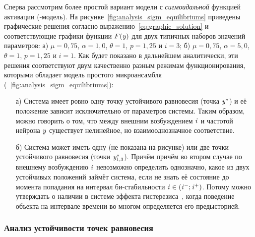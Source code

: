 Сперва рассмотрим более простой вариант модели с \textit{сигмоидальной} функцией активации (-модель). На рисунке~\ref{fig:analysis_sigm_equilibriums} приведены графические решения согласно выражению~\eqref{eq:graphic_solution} и соответствующие графики функции $F(\mathit{y})$ для двух типичных наборов значений параметров: а) $\mu = 0,75$, $\alpha = 1,0$, $\theta = 1$, $p = 1,25$ и $i = 3$; б) $\mu = 0,75$, $\alpha = 5,0$, $\theta = 1$, $p = 1,25$ и $i = 1$.
Как будет показано в дальнейшем аналитически, эти решения соответствуют двум качественно разным режимам функционирования, которыми обладает модель простого микроансамбля (\seefigure~\ref{fig:analysis_sigm_equilibriums}):
\begin{itemize}
    \item[а)] Система имеет ровно одну точку устойчивого равновесия (точка $\mathit{y}^{*}$) и её положение зависит исключительно от параметров системы. Таким образом, можно говорить о том, что между внешним возбуждением $\mathit{i}$ и частотой нейрона $\mathit{y}$ существует нелинейное, но взаимооднозначное соответствие.
    \item[б)] Система может иметь одну (не показана на рисунке) или две точки устойчивого равновесия (точки $\mathit{y}_{1,3}^{*}$). Причём причём во втором случае по внешнему возбуждению $\mathit{i}$ невозможно определить однозначно, какое из двух устойчивых положений займёт система, если не знать её состояние до момента попадания на интервал би-стабильности $\mathit{i} \in (\mathit{i}^{-}; \mathit{i}^{+})$. Потому можно утверждать о наличии в системе эффекта гистерезиса~\cite{Krasnoselsky1983}, когда поведение объекта на интервале времени во многом определяется его предысторией.
\end{itemize}

\subsubsection{Анализ устойчивости точек равновесия}

